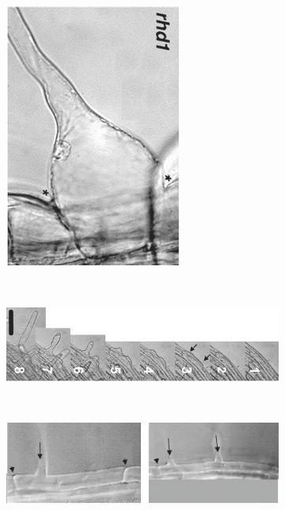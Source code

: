 \begin{figure}[t!]
\begin{subfigure}{3.3cm}
\end{subfigure}
\hspace{1.3cm}
\begin{subfigure}{3.3cm}
    \centering
    {\includegraphics[height=0.27\textheight]{fig01/rhd1}
    \caption{}\label{sf:multiRH02c_alt}}
\end{subfigure}
\\ \vspace{0.1cm}
\begin{subfigure}{10cm}
    \centering
    {\includegraphics[height=0.145\textheight]{fig01/mutantrhd6}
    \caption{}\label{sf:multiRH02d_alt}}
\end{subfigure}
\\ \vspace{0.1cm}
\begin{subfigure}{10cm}
    \centering
    {\includegraphics[height=0.16\textheight]{fig01/auxab}
    \caption{}\label{sf:multiRH02e_alt}}
\end{subfigure}

\end{figure}
